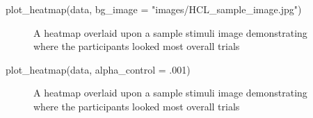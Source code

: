 \documentclass[
  man,
  floatsintext,
  longtable,
  nolmodern,
  notxfonts,
  notimes,
  colorlinks=true,linkcolor=blue,citecolor=blue,urlcolor=blue]{apa7}
\newenvironment{Shaded}{\begin{snugshade}}{\end{snugshade}}
\newcommand{\AttributeTok}[1]{\textcolor[rgb]{0.40,0.45,0.13}{#1}}
\newcommand{\DecValTok}[1]{\textcolor[rgb]{0.68,0.00,0.00}{#1}}
\newcommand{\FunctionTok}[1]{\textcolor[rgb]{0.28,0.35,0.67}{#1}}
\newcommand{\NormalTok}[1]{\textcolor[rgb]{0.00,0.23,0.31}{#1}}
\newcommand{\StringTok}[1]{\textcolor[rgb]{0.13,0.47,0.30}{#1}}
\begin{document}
\begin{Shaded}
\begin{Highlighting}[]
\FunctionTok{plot\_heatmap}\NormalTok{(data, }\AttributeTok{bg\_image =} \StringTok{"images/HCL\_sample\_image.jpg"}\NormalTok{)}
\end{Highlighting}
\end{Shaded}

\begin{figure}[H]

\caption{\label{fig-heatmap}A heatmap overlaid upon a sample stimuli
image demonstrating where the participants looked most overall trials}


\end{figure}%

\begin{Shaded}
\begin{Highlighting}[]
\FunctionTok{plot\_heatmap}\NormalTok{(data, }\AttributeTok{alpha\_control =}\NormalTok{ .}\DecValTok{001}\NormalTok{)}
\end{Highlighting}
\end{Shaded}

\begin{figure}[H]

\caption{\label{fig-heatmap-alpha-update}A heatmap overlaid upon a
sample stimuli image demonstrating where the participants looked most
overall trials}


\end{figure}%
\end{document}
